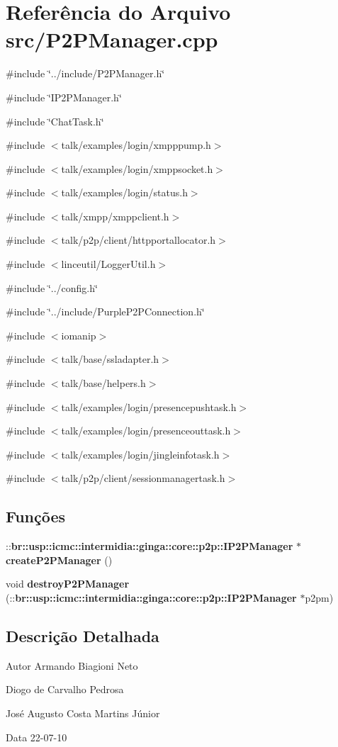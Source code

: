 \section{Referência do Arquivo src/P2PManager.cpp}
\label{P2PManager_8cpp}
{\ttfamily \#include \char`\"{}../include/P2PManager.h\char`\"{}}\par
{\ttfamily \#include \char`\"{}IP2PManager.h\char`\"{}}\par
{\ttfamily \#include \char`\"{}ChatTask.h\char`\"{}}\par
{\ttfamily \#include $<$talk/examples/login/xmpppump.h$>$}\par
{\ttfamily \#include $<$talk/examples/login/xmppsocket.h$>$}\par
{\ttfamily \#include $<$talk/examples/login/status.h$>$}\par
{\ttfamily \#include $<$talk/xmpp/xmppclient.h$>$}\par
{\ttfamily \#include $<$talk/p2p/client/httpportallocator.h$>$}\par
{\ttfamily \#include $<$linceutil/LoggerUtil.h$>$}\par
{\ttfamily \#include \char`\"{}../config.h\char`\"{}}\par
{\ttfamily \#include \char`\"{}../include/PurpleP2PConnection.h\char`\"{}}\par
{\ttfamily \#include $<$iomanip$>$}\par
{\ttfamily \#include $<$talk/base/ssladapter.h$>$}\par
{\ttfamily \#include $<$talk/base/helpers.h$>$}\par
{\ttfamily \#include $<$talk/examples/login/presencepushtask.h$>$}\par
{\ttfamily \#include $<$talk/examples/login/presenceouttask.h$>$}\par
{\ttfamily \#include $<$talk/examples/login/jingleinfotask.h$>$}\par
{\ttfamily \#include $<$talk/p2p/client/sessionmanagertask.h$>$}\par
\subsection*{Funções}
\begin{DoxyCompactItemize}
\item 
::{\bf br::usp::icmc::intermidia::ginga::core::p2p::IP2PManager} $\ast$ {\bfseries createP2PManager} ()\label{P2PManager_8cpp_a735e22b4506f475d96be71e79fb4cf97}

\item 
void {\bfseries destroyP2PManager} (::{\bf br::usp::icmc::intermidia::ginga::core::p2p::IP2PManager} $\ast$p2pm)\label{P2PManager_8cpp_a56aec5811fcec27b27f855bef6b04673}

\end{DoxyCompactItemize}


\subsection{Descrição Detalhada}
\begin{DoxyAuthor}{Autor}
Armando Biagioni Neto 

Diogo de Carvalho Pedrosa 

José Augusto Costa Martins Júnior 
\end{DoxyAuthor}
\begin{DoxyDate}{Data}
22-\/07-\/10 
\end{DoxyDate}
